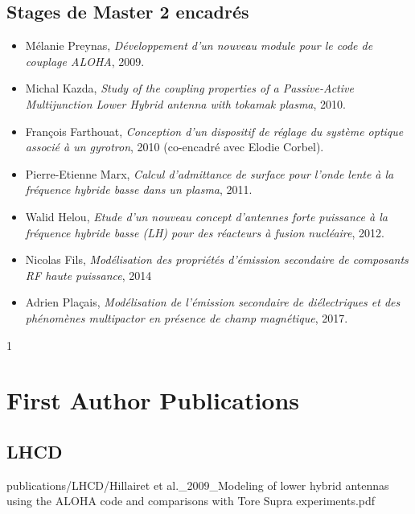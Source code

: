 \documentclass[
fontsize=10pt, %
twoside=true, %
numbers=noenddot, %
]{kaobook}
\def\addpublications{0}
\begin{document}
	\section*{Stages de Master 2 encadrés}
	\begin{itemize}
		\item Mélanie Preynas, \textit{Développement d’un nouveau module pour le code de couplage ALOHA}, 2009.
		\item Michal Kazda, \textit{Study of the coupling properties of a Passive-Active Multijunction Lower Hybrid antenna with tokamak plasma}, 2010.
		\item François Farthouat, \textit{Conception d'un dispositif de réglage du système optique associé à un gyrotron}, 2010 (co-encadré avec Elodie Corbel).
		\item Pierre-Etienne Marx, \textit{Calcul d'admittance de surface pour l'onde lente à la fréquence hybride basse dans un plasma}, 2011.
		\item Walid Helou, \textit{Etude d’un nouveau concept d’antennes forte puissance à la fréquence hybride basse (LH) pour des réacteurs à fusion nucléaire}, 2012.
		\item Nicolas Fils, \textit{Modélisation des propriétés d'émission secondaire de composants RF haute puissance}, 2014
		\item Adrien Plaçais, \textit{Modélisation de l'émission secondaire de diélectriques et des phénomènes multipactor en présence de champ magnétique}, 2017.
	\end{itemize}


	\if\addpublications1
	\chapter{First Author Publications}
	
	\section{LHCD}
	
		
		{publications/LHCD/Hillairet et al._2009_Modeling of lower hybrid antennas using the {ALOHA} code and comparisons with Tore Supra experiments.pdf}
		
\end{document}

